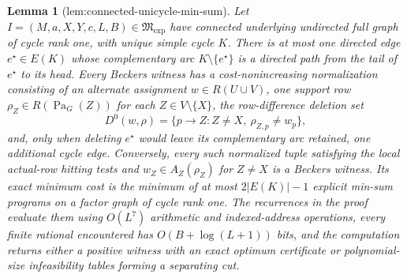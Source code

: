 \documentclass{article}
\newtheorem{lemma}{Lemma}
\begin{document}
\begin{lemma}[lem:connected-unicycle-min-sum]\label{lem:connected-unicycle-min-sum}
Let \(I=(M,a,X,Y,c,L,B)\in\mathfrak M_{\mathrm{exp}}\) have connected underlying undirected full graph of cycle rank one, with unique simple cycle \(K\). There is at most one directed edge \(e^\star\in E(K)\) whose complementary arc \(K\setminus\{e^\star\}\) is a directed path from the tail of \(e^\star\) to its head. Every Beckers witness has a cost-nonincreasing normalization consisting of an alternate assignment \(w\in R(U\cup V)\), one support row \(\rho_Z\in R(\operatorname{Pa}_G(Z))\) for each \(Z\in V\setminus\{X\}\), the row-difference deletion set
\[
 D^0(w,\rho)=\{p\to Z:Z\ne X,\ \rho_{Z,p}\ne w_p\},
\]
and, only when deleting \(e^\star\) would leave its complementary arc retained, one additional cycle edge. Conversely, every such normalized tuple satisfying the local actual-row hitting tests and \(w_Z\in A_Z(\rho_Z)\) for \(Z\ne X\) is a Beckers witness. Its exact minimum cost is the minimum of at most \(2|E(K)|-1\) explicit min-sum programs on a factor graph of cycle rank one. The recurrences in the proof evaluate them using \(O(L^7)\) arithmetic and indexed-address operations, every finite rational encountered has \(O(B+\log(L+1))\) bits, and the computation returns either a positive witness with an exact optimum certificate or polynomial-size infeasibility tables forming a separating cut.
\end{lemma}
\end{document}
